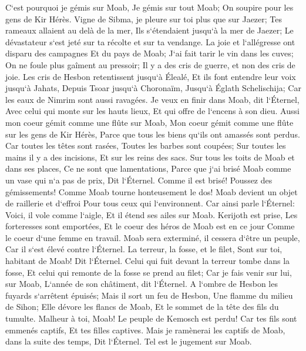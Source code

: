 \verse C`est pourquoi je gémis sur Moab, Je gémis sur tout Moab; On soupire pour les gens de Kir Hérès. 
\verse Vigne de Sibma, je pleure sur toi plus que sur Jaezer; Tes rameaux allaient au delà de la mer, Ils s`étendaient jusqu`à la mer de Jaezer; Le dévastateur s`est jeté sur ta récolte et sur ta vendange. 
\verse La joie et l`allégresse ont disparu des campagnes Et du pays de Moab; J`ai fait tarir le vin dans les cuves; On ne foule plus gaîment au pressoir; Il y a des cris de guerre, et non des cris de joie. 
\verse Les cris de Hesbon retentissent jusqu`à Élealé, Et ils font entendre leur voix jusqu`à Jahats, Depuis Tsoar jusqu`à Choronaïm, Jusqu`à Églath Schelischija; Car les eaux de Nimrim sont aussi ravagées. 
\verse Je veux en finir dans Moab, dit l`Éternel, Avec celui qui monte sur les hauts lieux, Et qui offre de l`encens à son dieu. 
\verse Aussi mon coeur gémit comme une flûte sur Moab, Mon coeur gémit comme une flûte sur les gens de Kir Hérès, Parce que tous les biens qu`ils ont amassés sont perdus. 
\verse Car toutes les têtes sont rasées, Toutes les barbes sont coupées; Sur toutes les mains il y a des incisions, Et sur les reins des sacs. 
\verse Sur tous les toits de Moab et dans ses places, Ce ne sont que lamentations, Parce que j`ai brisé Moab comme un vase qui n`a pas de prix, Dit l`Éternel. 
\verse Comme il est brisé! Poussez des gémissements! Comme Moab tourne honteusement le dos! Moab devient un objet de raillerie et d`effroi Pour tous ceux qui l`environnent. 
\verse Car ainsi parle l`Éternel: Voici, il vole comme l`aigle, Et il étend ses ailes sur Moab. 
\verse Kerijoth est prise, Les forteresses sont emportées, Et le coeur des héros de Moab est en ce jour Comme le coeur d`une femme en travail. 
\verse Moab sera exterminé, il cessera d`être un peuple, Car il s`est élevé contre l`Éternel. 
\verse La terreur, la fosse, et le filet, Sont sur toi, habitant de Moab! Dit l`Éternel. 
\verse Celui qui fuit devant la terreur tombe dans la fosse, Et celui qui remonte de la fosse se prend au filet; Car je fais venir sur lui, sur Moab, L`année de son châtiment, dit l`Éternel. 
\verse A l`ombre de Hesbon les fuyards s`arrêtent épuisés; Mais il sort un feu de Hesbon, Une flamme du milieu de Sihon; Elle dévore les flancs de Moab, Et le sommet de la tête des fils du tumulte. 
\verse Malheur à toi, Moab! Le peuple de Kemosch est perdu! Car tes fils sont emmenés captifs, Et tes filles captives. 
\verse Mais je ramènerai les captifs de Moab, dans la suite des temps, Dit l`Éternel. Tel est le jugement sur Moab. 

